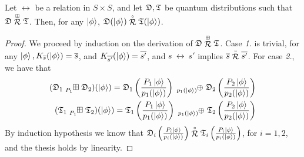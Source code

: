 \begin{proposition}
	Let $\rel$ be a relation in $S \times S$, and let $\mathfrak{D}, \mathfrak{T}$ be quantum distributions such that $\mathfrak{D} \stackrel{\scriptscriptstyle \boxplus}{\mathcal{R}} \mathfrak{T}$.
	Then, for any $\ket{\phi}$, $\mathfrak{D}(\ket{\phi}) \stackrel{\scriptscriptstyle \circ}{\mathcal{R}} \mathfrak{T}(\ket{\phi})$.
\end{proposition}
\begin{proof}
	We proceed by induction on the derivation of $\mathfrak{D} \stackrel{\scriptscriptstyle \boxplus}{\mathcal{R}} \mathfrak{T}$.
	Case \textit{1.} is trivial, for any $\ket{\phi}, K_{\overline{s}}(\ket{\phi}) = \overline{s}$, and $K_{\overline{s'}}(\ket{\phi}) = \overline{s'}$, and $s\ \rel\ s'$ implies $\overline{s} \stackrel{\scriptscriptstyle \circ}{\mathcal{R}} \overline{s'}$.
	For case \textit{2.}, we have that
	\begin{align*}
	(\quantumdst_1 \qsum{P_1} \quantumdst_2) (\ket{\phi}) = \quantumdst_1 \left(\frac{P_1 \ket{\phi}}{p_1(\ket{\phi})}\right) \tensor[_{p_1(\ket{\phi})}]{\oplus}{} \quantumdst_2 \left(\frac{P_2 \ket{\phi}}{p_2(\ket{\phi})}\right)\\
	(\quantumdsta_1 \qsum{P_1} \quantumdsta_2) (\ket{\phi}) = \quantumdsta_1 \left(\frac{P_1 \ket{\phi}}{p_1(\ket{\phi})}\right) \tensor[_{p_1(\ket{\phi})}]{\oplus}{} \quantumdsta_2 \left(\frac{P_2 \ket{\phi}}{p_2(\ket{\phi})}\right)
	\end{align*}
	By induction hypothesis we know that $\mathfrak{D}_i \left(\frac{P_i \ket{\phi}}{p_i(\ket{\phi})}\right) \stackrel{\scriptscriptstyle \circ}{\mathcal{R}} \mathfrak{T}_i \left(\frac{P_i \ket{\phi}}{p_i(\ket{\phi})}\right)$, for $i = 1,2$, and the thesis holds by linearity.
\end{proof}


%

%

